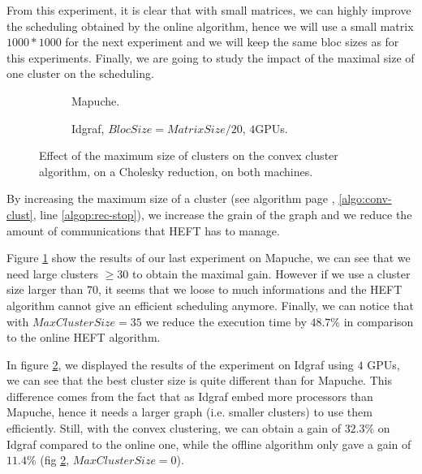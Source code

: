 \documentclass[10pt, conference, compsocconf,pdftex,dvipsnames]{IEEEtran}
\begin{document}
From this experiment, it is clear that with small matrices, we can highly
improve the scheduling obtained by the online algorithm, hence we will use a
small matrix $1000*1000$ for the next experiment and we will keep the same bloc
sizes as for this experiments. Finally, we are going to study the impact of the
maximal size of one cluster on the scheduling.

\begin{figure}[tb]
        \centering
        \begin{subfigure}{0.4\textwidth}
            \hspace{-20pt}
            \scalebox{0.7}{
                
            }
            \caption{Mapuche.}
            \label{fig:ClustersMapuche}
        \end{subfigure}
        \hspace{15pt}
        \begin{subfigure}{0.55\textwidth}
            \scalebox{0.7}{
                
            }
            \caption{Idgraf, $BlocSize=MatrixSize/20$, $4$GPUs.}
            \label{fig:ClustersIdgraf}
        \end{subfigure}

    \caption{Effect of the maximum size of clusters on the convex cluster
    algorithm, on a Cholesky reduction, on both machines.}
    \label{fig:Clusters}
\end{figure}

By increasing the maximum size of a cluster (see algorithm
page \pageref{algo:conv-clust}, \ref{algo:conv-clust}, line
\ref{algop:rec-stop}), we increase the grain of the graph and we reduce the
amount of communications that HEFT has to manage.

Figure \ref{fig:ClustersMapuche} show the results of our last experiment on
Mapuche, we can see that we need large clusters $\geq 30$ to obtain the maximal
gain. However if we use a cluster size larger than $70$, it seems that we
loose to much informations and the HEFT algorithm cannot give an efficient
scheduling anymore. Finally, we can notice that with $MaxClusterSize=35$ we
reduce the execution time by $48.7\%$ in comparison to the online HEFT
algorithm.

In figure \ref{fig:ClustersIdgraf}, we displayed the results of the
experiment on Idgraf using $4$ GPUs, we can see that the best cluster size is
quite different than for Mapuche. This difference comes from the fact that as
Idgraf embed more processors than Mapuche, hence it needs a larger graph (i.e.
smaller clusters) to use them efficiently. Still, with the convex clustering,
we can obtain a gain of $32.3\%$ on Idgraf compared to the online one, while
the offline algorithm only gave a gain of $11.4\%$ (fig
\ref{fig:ClustersIdgraf}, $MaxClusterSize=0$).
\end{document}
